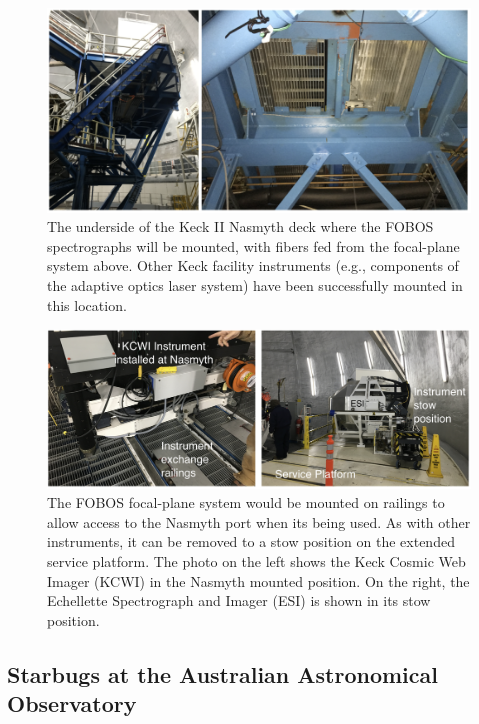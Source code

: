 \documentclass[oneside,11pt]{amsart}
\begin{document}
\begin{figure}[h!]
%
\vskip -0.1in
%
\includegraphics[width=\textwidth]{figs/nasmyth_deck.png}
%
\caption{\small The underside of the Keck II Nasmyth deck where the
FOBOS spectrographs will be mounted, with fibers fed from the
focal-plane system above.  Other Keck facility instruments (e.g.,
components of the adaptive optics laser system) have been successfully
mounted in this location.}
%
\label{fig:nasmyth_mount}
%
\end{figure}


\begin{figure}[h!]
%
\vskip -0.1in
%
\includegraphics[width=\textwidth]{figs/Keck_instrument_exchange.png}
%
\caption{\small The FOBOS focal-plane system would be mounted on
railings to allow access to the Nasmyth port when its being used.  As
with other instruments, it can be removed to a stow position on the
extended service platform.  The photo on the left shows the Keck Cosmic
Web Imager (KCWI) in the Nasmyth mounted position.  On the right, the
Echellette Spectrograph and Imager (ESI) is shown in its stow position.}
%
\label{fig:keck_exchange}
%
\end{figure}

\subsection*{Starbugs at the Australian Astronomical Observatory}
\label{sec:AAO}
\end{document}
